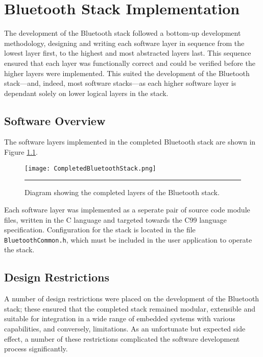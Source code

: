 \chapter{Bluetooth Stack Implementation}
\label{chp:btstackimp}

The development of the Bluetooth stack followed a bottom-up development methodology, designing and writing each software layer in sequence from the lowest layer first, to the highest and most abstracted layers last. This sequence ensured that each layer was functionally correct and could be verified before the higher layers were implemented. This suited the development of the Bluetooth stack---and, indeed, most software stacks---as each higher software layer is dependant solely on lower logical layers in the stack.

\section{Software Overview}

The software layers implemented in the completed Bluetooth stack are shown in Figure \ref{fig:completedbtstacklayers}.

\begin{figure}[tbph]
	\vspace{1em}
	\centering
		\texttt{[image: CompletedBluetoothStack.png]}
	\rule{35em}{0.5pt}
	\caption[Diagram of the completed Bluetooth stack layers]{Diagram showing the completed layers of the Bluetooth stack.}
	\label{fig:completedbtstacklayers}
\end{figure}

Each software layer was implemented as a seperate pair of source code module files, written in the C language and targeted towards the C99 language specification. Configuration for the stack is located in the file \texttt{BluetoothCommon.h}, which must be included in the user application to operate the stack.


\section{Design Restrictions}

A number of design restrictions were placed on the development of the Bluetooth stack; these ensured that the completed stack remained modular, extensible and suitable for integration in a wide range of embedded systems with various capabilities, and conversely, limitations. As an unfortunate but expected side effect, a number of these restrictions complicated the software development process significantly.

